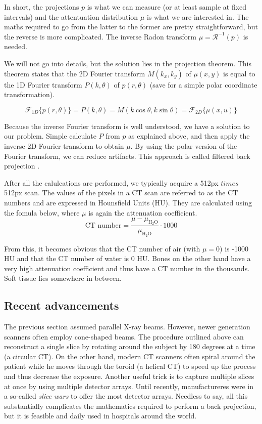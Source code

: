 In short, the projections $p$ is what we can measure (or at least sample at
fixed intervals) and the attentuation distribution $\mu$ is what we are
interested in. The maths required to go from the latter to the former are pretty
straightforward, but the reverse is more complicated. The inverse Radon
transform $\mu = \mathscr{R}^{-1}(p)$ is needed.

We will not go into details, but the solution lies in the projection theorem.
This theorem states that the 2D Fourier transform $M(k_x, k_y)$ of $\mu(x,y)$
is equal to the 1D Fourier transform $P(k, \theta)$ of $p(r, \theta)$ (save for
a simple polar coordinate transformation).

\begin{equation}
\mathscr{F}_{1D}\{ p(r, \theta) \} = P(k, \theta) = M(k \cos \theta, k \sin
\theta) = \mathscr{F}_{2D}\{ \mu(x, u) \}
\end{equation}

Because the inverse Fourier transform is well understood, we have a solution to
our problem. Simple calculate $P$ from $p$ as explained above, and then apply
the inverse 2D Fourier transform to obtain $\mu$. By using the polar version of
the Fourier transform, we can reduce artifacts. This approach is called filtered
back projection \cite{suetens}.

After all the calulcations are performed, we typically acquire a 512px $times$
512px scan. The values of the pixels in a CT scan are referred to as the CT
numbers and are expressed in Hounsfield Units (HU). They are calculated using
the fomula below, where $\mu$ is again the attenuation coefficient.
\begin{equation}
	\text{CT number} = \frac{\mu -
	\mu_{\text{H}_2\text{O}}}{\mu_{\text{H}_2\text{O}}} \cdot 1000
\end{equation}

From this, it becomes obvious that the CT number of air (with $\mu = 0$) is
-1000 HU and that the CT number of water is 0 HU. Bones on the other hand have a
very high attenuation coefficient and thus have a CT number in the thousands.
Soft tissue lies somewhere in between.

\subsection{Recent advancements}
The previous section assumed parallel X-ray beams. However, newer generation
scanners often employ cone-shaped beams. The procedure outlined above can
reconstruct a single slice by rotating around the subject by 180 degrees at a
time (a circular CT). On the other hand, modern CT scanners often spiral around
the patient while he moves through the toroid (a helical CT) to speed up the
process and thus decrease the exposure. Another useful trick is to capture
multiple slices at once by using multiple detector arrays. Until recently,
manufactureres were in a so-called \emph{slice wars} to offer the most detector
arrays. Needless to say, all this substantially complicates the mathematics
required to perform a back projection, but it is feasible and daily used in
hospitals around the world.

